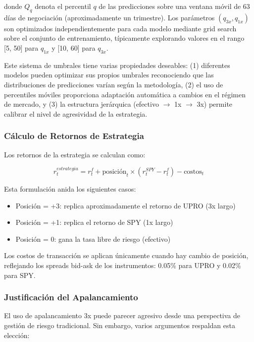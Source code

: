 \documentclass[11pt,a4paper]{article}
\begin{document}
donde $Q_q$ denota el percentil $q$ de las predicciones sobre una ventana móvil de 63 días de negociación (aproximadamente un trimestre). Los parámetros $(q_{3x}, q_{1x})$ son optimizados independientemente para cada modelo mediante grid search sobre el conjunto de entrenamiento, típicamente explorando valores en el rango [5, 50] para $q_{1x}$ y [10, 60] para $q_{3x}$.

Este sistema de umbrales tiene varias propiedades deseables: (1) diferentes modelos pueden optimizar sus propios umbrales reconociendo que las distribuciones de predicciones varían según la metodología, (2) el uso de percentiles móviles proporciona adaptación automática a cambios en el régimen de mercado, y (3) la estructura jerárquica (efectivo $\rightarrow$ 1x $\rightarrow$ 3x) permite calibrar el nivel de agresividad de la estrategia.

\subsubsection{Cálculo de Retornos de Estrategia}

Los retornos de la estrategia se calculan como:

\begin{equation}
r_t^{estrategia} = r_t^f + \text{posición}_t \times (r_t^{SPY} - r_t^f) - \text{costos}_t
\end{equation}

Esta formulación anida los siguientes casos:
\begin{itemize}[noitemsep]
    \item Posición = +3: replica aproximadamente el retorno de UPRO (3x largo)
    \item Posición = +1: replica el retorno de SPY (1x largo)
    \item Posición = 0: gana la tasa libre de riesgo (efectivo)
\end{itemize}

Los costos de transacción se aplican únicamente cuando hay cambio de posición, reflejando los spreads bid-ask de los instrumentos: 0.05\% para UPRO y 0.02\% para SPY.

\subsubsection{Justificación del Apalancamiento}

El uso de apalancamiento 3x puede parecer agresivo desde una perspectiva de gestión de riesgo tradicional. Sin embargo, varios argumentos respaldan esta elección:
\end{document}
